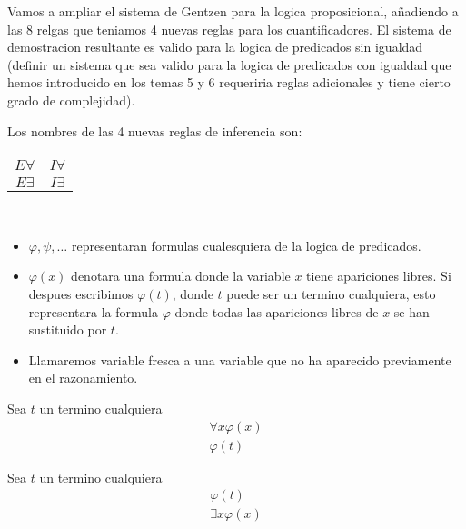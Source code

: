 Vamos a ampliar el sistema de Gentzen para la logica proposicional, añadiendo a las 8 relgas que teniamos 4 nuevas reglas para los cuantificadores. El sistema de demostracion resultante es valido para la logica de predicados sin igualdad (definir un sistema que sea valido para la logica de predicados con igualdad que hemos introducido en los temas 5 y 6 requeriria reglas adicionales y tiene cierto grado de complejidad).

Los nombres de las 4 nuevas reglas de inferencia son:

\begin{table}[H]
	\centering
	\begin{tabular}{|c|c|}
		\hline
		\(E \forall \) & \(I \forall \) \\ \hline
		\hline
		\(E \exists \) & \(I \exists \) \\
		\hline
	\end{tabular}
	\label{tab:label}
\end{table}

\begin{proposition}
	~\begin{itemize}
		\item \(\varphi, \psi, \ldots \) representaran formulas cualesquiera de la logica de predicados.
		\item \(\varphi(x )\) denotara una formula donde la variable \(x \) tiene apariciones libres. Si despues escribimos \(\varphi(t )\), donde \(t \) puede ser un termino cualquiera, esto representara la formula \(\varphi\) donde todas las apariciones libres de \(x \) se han sustituido por \(t \).
		\item Llamaremos variable fresca a una variable que no ha aparecido previamente en el razonamiento.
	\end{itemize}
\end{proposition}
\pagebreak
\begin{definition}
	Sea \(t \) un termino cualquiera
	\[
		\begin{array}{c}
			\forall x \varphi(x) \\ \hline
			\varphi(t)
		\end{array}
	\]
\end{definition}

\begin{definition}
	Sea \(t \) un termino cualquiera
	\[
		\begin{array}{c }
			\varphi(t) \\ \hline
			\exists  x \varphi(x )
		\end{array}
	\]
\end{definition}

